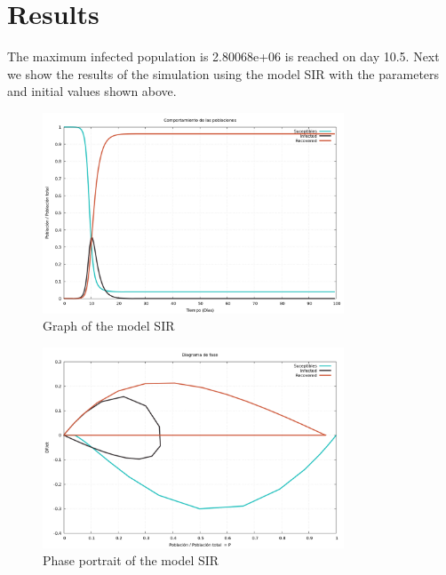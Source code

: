 \documentclass{article}
\begin{document}
\section*{Results}
The maximum infected population is 2.80068e+06 is reached on day 10.5.
Next we show the results of the simulation using the model SIR with the parameters and initial values shown above.
\begin{figure}[H]
\centering
\includegraphics[width=0.8\textwidth]{./data/Prueba2/graph-SIR.png}
\caption{Graph of the model SIR}
\end{figure}
\begin{figure}[H]
\centering
\includegraphics[width=0.8\textwidth]{./data/Prueba2/phase-SIR.png}
\caption{Phase portrait of the model SIR}
\end{figure}
\end{document}
